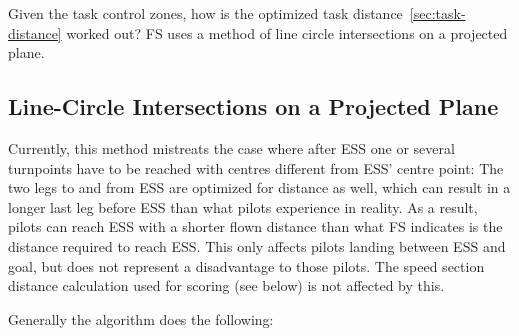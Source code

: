 \documentclass[gap.tex]{subfiles}
\begin{document}
\label{sec:shortest-route}
Given the task control zones, how is the optimized task
distance~\ref{sec:task-distance} worked out? FS uses a method of line circle
intersections on a projected plane.

\subsection{Line-Circle Intersections on a Projected Plane}
Currently, this method mistreats the case where after ESS one or several
turnpoints have to be reached with centres different from ESS’ centre point:
The two legs to and from ESS are optimized for distance as well, which can
result in a longer last leg before ESS than what pilots experience in reality.
As a result, pilots can reach ESS with a shorter flown distance than what FS
indicates is the distance required to reach ESS. This only affects pilots
landing between ESS and goal, but does not represent a disadvantage to those
pilots. The speed section distance calculation used for scoring (see below) is
not affected by this.

Generally the algorithm does the following:
\end{document}
